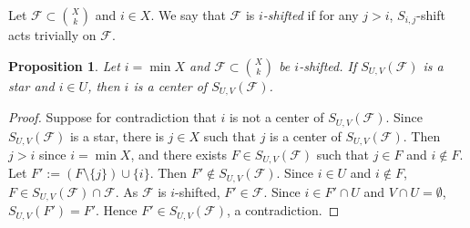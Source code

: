 \documentclass[a4paper,11pt]{article}
\newtheorem{proposition}[theorem]{Proposition}
\newcommand{\m}{\mathcal}
\begin{document}
Let $\m F\subset {X\choose k}$ and $i\in X$. We say that $\m F$ is {\it $i$-shifted} if for any $j>i$, $S_{i,j}$-shift acts trivially on $\m F$.

\begin{proposition}\label{suvcenter}
Let $i=\min X$ and $\m F\subset {X\choose k}$ be $i$-shifted.  If $S_{U,V}(\m F)$ is a star and $i\in U$, then $i$ is a center of $S_{U,V}(\m F)$.
\end{proposition}

\begin{proof}
Suppose for contradiction that $i$ is not a center of $S_{U,V}(\m F)$. 
Since $S_{U,V}(\m F)$ is a star, there is $j\in X$ such that $j$ is a center of $S_{U,V}(\m F)$. Then $j>i$ since $i=\min X$, and there exists $F\in S_{U,V}(\m F)$ such that $j\in F$ and $i\not\in F$. 
Let $F':=(F\setminus \{j\})\cup \{i\}$. Then $F'\not\in S_{U,V}(\m F)$. 
Since $i\in U$ and $i\not\in F$, $F\in S_{U,V}(\m F) \cap \m F$. As $\m F$ is $i$-shifted, $F'\in \m F$. 
Since $i\in F'\cap U$ and $V\cap U=\emptyset$, $S_{U,V}(F')=F'$. Hence $F'\in S_{U,V}(\m F)$, a contradiction.
\end{proof}
\end{document}
